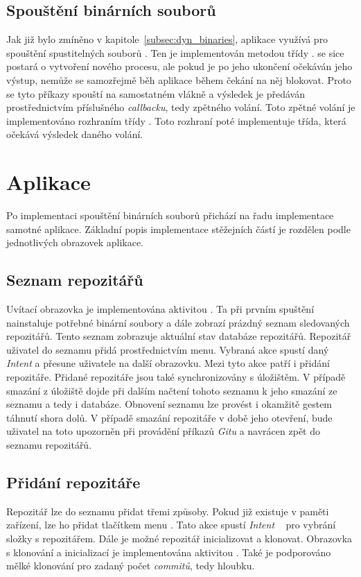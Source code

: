    \subsection{Spouštění binárních souborů}
    Jak již bylo zmíněno v kapitole~\ref{subsec:dyn_binaries}, aplikace využívá pro spouštění spustitelných souborů . Ten je implementován metodou  třídy .  se sice postará o vytvoření nového procesu, ale pokud je po jeho ukončení očekáván jeho výstup, nemůže se samozřejmě běh aplikace během čekání na něj blokovat. Proto se tyto příkazy spouští na samostatném vlákně a výsledek je předáván prostřednictvím příslušného \emph{callbacku}, tedy zpětného volání. Toto zpětné volání je implementováno rozhraním  třídy . Toto rozhraní poté implementuje třída, která očekává výsledek daného volání.

\section{Aplikace}
Po implementaci spouštění binárních souborů přichází na řadu implementace samotné aplikace. Základní popis implementace stěžejních částí je rozdělen podle jednotlivých obrazovek aplikace.

    \subsection{Seznam repozitářů}
    Uvítací obrazovka je implementována aktivitou . Ta při prvním spuštění nainstaluje potřebné binární soubory a dále zobrazí prázdný seznam sledovaných repozitářů. Tento seznam zobrazuje aktuální stav databáze repozitářů. Repozitář uživatel do seznamu přidá prostřednictvím menu. Vybraná akce spustí daný \emph{Intent} a přesune uživatele na další obrazovku. Mezi tyto akce patří i přidání repozitáře. Přidané repozitáře jsou také synchronizovány s úložištěm. V případě smazání z úložiště dojde při dalším načtení tohoto seznamu k jeho smazání ze seznamu a tedy i databáze. Obnovení seznamu lze provést i okamžitě gestem táhnutí shora dolů. V případě smazání repozitáře v době jeho otevření, bude uživatel na toto upozorněn při provádění příkazů \emph{Gitu} a navrácen zpět do seznamu repozitářů. 

    \subsection{Přidání repozitáře}
    Repozitář lze do seznamu přidat třemi způsoby. Pokud již existuje v paměti zařízení, lze ho přidat tlačítkem menu . Tato akce spustí \emph{Intent} ~ pro vybrání složky s repozitářem. Dále je možné repozitář inicializovat a klonovat. Obrazovka s klonování a inicializací je implementována aktivitou . Také je podporováno mělké klonování pro zadaný počet \emph{commitů}, tedy hloubku.


